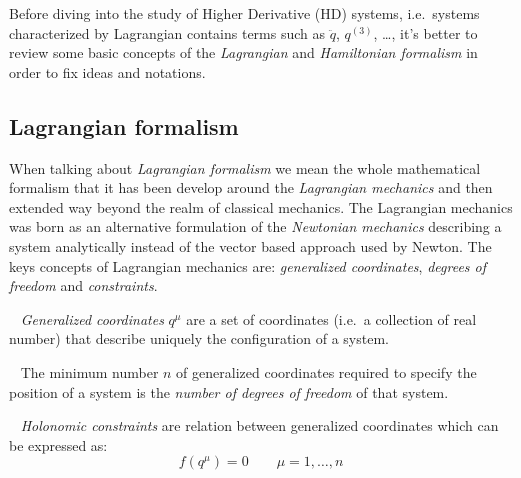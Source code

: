 Before diving into the study of Higher Derivative (HD) systems, i.e.\
systems characterized by Lagrangian contains terms such as $\ddot{q}$,
${q}^{(3)}$, \dots, it's better to review some basic concepts of the
\emph{Lagrangian} and \emph{Hamiltonian formalism} in order to fix ideas and
notations.

\subsection{Lagrangian formalism}\label{subsection: lagrangian_formalism}
When talking about \emph{Lagrangian formalism} we mean the whole mathematical
formalism that it has been develop around the \emph{Lagrangian mechanics} and then
extended way beyond the realm of classical mechanics. The Lagrangian mechanics
was born as an alternative formulation of the \emph{Newtonian mechanics}
describing a system analytically
instead of the vector based approach used by
Newton. The keys concepts of Lagrangian mechanics are: \emph{generalized
coordinates}, \emph{degrees of freedom} and \emph{constraints}.

\begin{definition}\label{def: generalized coordinates}~\cite{Ginsberg08}
  \emph{Generalized coordinates} $q^{\mu}$ are a set of coordinates (i.e.\ a
  collection of real number) that describe uniquely the configuration of a
  system.
\end{definition}

\begin{definition}\label{def: dof}~\cite{Ginsberg08}
  The minimum number $n$ of generalized coordinates required to specify the
  position of a system is the \emph{number of degrees of freedom} of that
  system.
\end{definition}

\begin{definition}\label{def: holonomic constraints}~\cite{
  Goldstein11_hol_constraints}
  \emph{Holonomic constraints} are relation between generalized coordinates
  which can be expressed as:
  \begin{equation*}
      f(q^{\mu}) = 0 \qquad \mu = 1, \ldots, n
  \end{equation*}
\end{definition}


